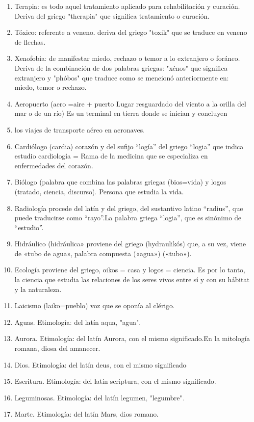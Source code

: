 \documentclass{mylib/reporte}
\begin{document}
\begin{enumerate}
	\item Terapia: es todo aquel tratamiento aplicado para rehabilitación y curación. Deriva del griego "therapia" que significa tratamiento o curación.
	\item Tóxico: referente a veneno. deriva del griego "toxik" que se traduce en veneno de flechas.
	\item Xenofobia: de manifestar miedo, rechazo o temor a lo extranjero o foráneo. Deriva de la combinación de dos palabras griegas: "xénos" que significa extranjero y "phóbos" que traduce como se mencionó anteriormente en: miedo, temor o rechazo.
	\item Aeropuerto (aero =aire + puerto  Lugar resguardado del viento a la orilla del mar o de un río)  Es  un  terminal en tierra donde se inician y concluyen
	\item los viajes de transporte aéreo en aeronaves.
	\item Cardiólogo  (cardia) corazón y del sufijo “logía” del griego “logia” que indica estudio cardiología = Rama de la medicina que se especializa en enfermedades del corazón.
	\item Biólogo (palabra  que combina las palabras griegas (bios=vida) y logos (tratado, ciencia, discurso). Persona que estudia la vida.
	\item Radiología procede del latín y del griego, del  sustantivo latino “radius”, que puede traducirse como “rayo”.La palabra griega “logia”, que es sinónimo de “estudio”.
	\item Hidráulico (hidráulica» proviene del griego  (hydraulikós) que, a su vez, viene de «tubo de agua», palabra compuesta  («agua») («tubo»).
	\item Ecología proviene del griego, oikos = casa y logos = ciencia. Es por lo tanto, la ciencia que estudia las relaciones de los seres vivos entre sí y con su hábitat y la naturaleza.
	\item Laicismo (laiko=pueblo) voz que se oponía al clérigo.
	\item Aguas. Etimología: del latín aqua, "agua".
	\item Aurora. Etimología: del latín Aurora, con el mismo significado.En la mitología romana, diosa del amanecer.
	\item Dios. Etimología: del latín deus, con el mismo significado
	\item Escritura. Etimología: del latín scriptura, con el mismo significado.
	\item Leguminosas. Etimología: del latín legumen, "legumbre".
	\item Marte. Etimología: del latín Mars, dios romano.

\end{enumerate}
\end{document}
